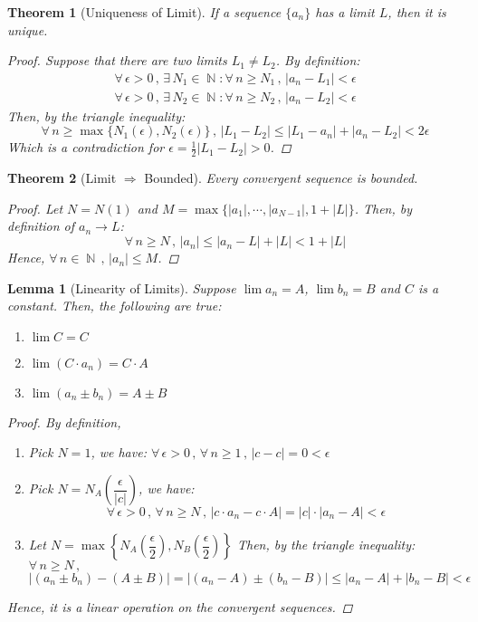 \documentclass[12pt]{article}
\let\RA\Rightarrow
\newcommand{\Forall}[1]{\forall\,{#1}\,,\,}
\newcommand{\Exist}[1]{\exists\,{#1}:}
\DeclareMathOperator{\N}{\mathbb{N}}
\newtheorem{theorem}{Theorem}[subsection]
\newtheorem{lemma}{Lemma}[subsection]
\begin{document}
\begin{theorem}[Uniqueness of Limit]
  If a sequence $\{a_n\}$ has a limit $L$, then it is unique.
  \begin{proof}
    Suppose that there are two limits $L_1 \neq L_2$. By definition:
    \begin{align*}
      \Forall{\epsilon>0}\Exist{N_1\in\N}\Forall{n\geq N_1} |a_n-L_1| <\epsilon\\
      \Forall{\epsilon>0}\Exist{N_2\in\N}\Forall{n\geq N_2} |a_n-L_2| <\epsilon
    \end{align*}
    Then, by the triangle inequality:
    $$\Forall{n\geq \max\{N_1(\epsilon),N_2(\epsilon)\}}|L_1- L_2| \leq |L_1- a_n|+|a_n- L_2| < 2\epsilon$$
    Which is a contradiction for $\epsilon=\frac{1}{2}| L_1- L_2|>0$.
  \end{proof}
\end{theorem}

\begin{theorem}[Limit $\RA$ Bounded]
  Every convergent sequence is bounded.
  \begin{proof}
    Let $N=N(1)$ and $M=\max{\big\{|a_1|,\cdots,|a_{N-1}|, 1+| L| \big\}}$. Then, by definition of $a_n\to L$:
    $$\Forall{n\geq N}| a_n|\leq | a_n-L|+| L| <1+| L| $$
    Hence, $\Forall{n\in\N}| a_n|\leq M$.
  \end{proof}
\end{theorem}

\begin{lemma}[Linearity of Limits]
  Suppose $\lim a_n=A$, $\lim b_n=B$ and $C$ is a constant. Then, the following are true:
  \begin{enumerate}
    \item $\lim C=C$
    \item $\lim (C\cdot a_n)=C\cdot A$
    \item $\lim (a_n\pm b_n)=A\pm B$ 
  \end{enumerate}
  \begin{proof}
    By definition,
    \begin{enumerate}
    \item Pick $N=1$, we have: $\Forall{\epsilon>0}\Forall{n\geq 1} |c-c|=0<\epsilon$
    \item Pick $N=N_A\left(\dfrac{\epsilon}{|c|}\right)$, we have: $$\Forall{\epsilon>0}\Forall{n\geq N} |c\cdot a_n-c\cdot A|=|c|\cdot|a_n-A| <\epsilon$$
    \item Let $N=\max\left\{N_A\left(\dfrac{\epsilon}{2}\right),N_B\left(\dfrac{\epsilon}{2}\right)\right\}$
    Then, by the triangle inequality: $\Forall{n\geq N}$
    $$|(a_n\pm b_n)-(A\pm B)| =|(a_n-A)\pm(b_n-B)|\leq |a_n-A|+|b_n- B| < \epsilon$$
    \end{enumerate}
    Hence, it is a linear operation on the convergent sequences.
  \end{proof}
\end{lemma}
\end{document}
